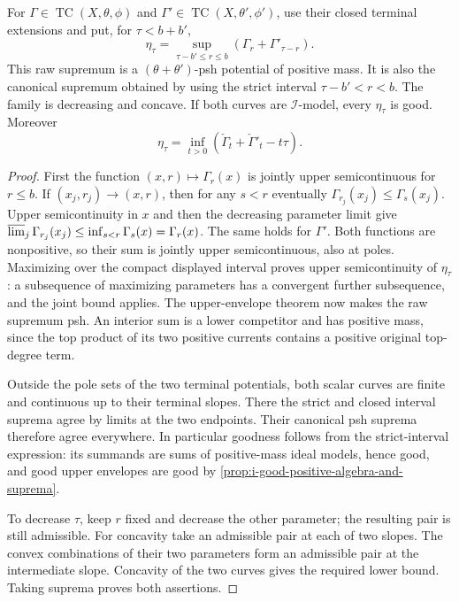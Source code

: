 \begin{lemma}\label{lem:test-curve-closed-sup-convolution}
For $\Gamma\in\operatorname{TC}(X,\theta,\phi)$ and
$\Gamma'\in\operatorname{TC}(X,\theta',\phi')$, use their closed terminal extensions and put, for $\tau<b+b'$,
\[
 \eta_\tau=\sup_{\tau-b'\leq r\leq b}
                         (\Gamma_r+\Gamma'_{\tau-r}).
\]
This raw supremum is a $(\theta+\theta')$-psh potential of positive mass. It is also the canonical supremum obtained by using the strict interval $\tau-b'<r<b$. The family is decreasing and concave. If both curves are $\mathcal I$-model, every $\eta_\tau$ is good.
Moreover
\[
 \eta_\tau=\inf_{t>0}(\check\Gamma_t+\check\Gamma'_t-t\tau).
\]
\end{lemma}
\begin{proof}
First the function $(x,r)\mapsto\Gamma_r(x)$ is jointly upper semicontinuous for $r\leq b$. If $(x_j,r_j)\to(x,r)$, then for any $s<r$ eventually $\Gamma_{r_j}(x_j)\leq\Gamma_s(x_j)$. Upper semicontinuity in $x$ and then the decreasing parameter limit give
$\varlimsup_j\Gamma_{r_j}(x_j)\leq\inf_{s<r}\Gamma_s(x)=\Gamma_r(x)$.
The same holds for $\Gamma'$. Both functions are nonpositive, so their sum is jointly upper semicontinuous, also at poles. Maximizing over the compact displayed interval proves upper semicontinuity of $\eta_\tau$: a subsequence of maximizing parameters has a convergent further subsequence, and the joint bound applies. The upper-envelope theorem now makes the raw supremum psh. An interior sum is a lower competitor and has positive mass, since the top product of its two positive currents contains a positive original top-degree term.

Outside the pole sets of the two terminal potentials, both scalar curves are finite and continuous up to their terminal slopes. There the strict and closed interval suprema agree by limits at the two endpoints. Their canonical psh suprema therefore agree everywhere. In particular goodness follows from the strict-interval expression: its summands are sums of positive-mass ideal models, hence good, and good upper envelopes are good by \cref{prop:i-good-positive-algebra-and-suprema}.

To decrease $\tau$, keep $r$ fixed and decrease the other parameter; the resulting pair is still admissible. For concavity take an admissible pair at each of two slopes. The convex combinations of their two parameters form an admissible pair at the intermediate slope. Concavity of the two curves gives the required lower bound. Taking suprema proves both assertions.


\end{proof}
